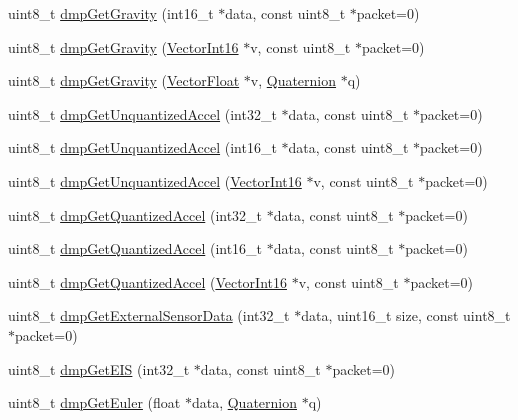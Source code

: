 \begin{DoxyCompactItemize}
\item 
uint8\+\_\+t \mbox{\hyperlink{classMPU6050_a557400f9ca5f07ff7d0d71f27f7a5169}{dmp\+Get\+Gravity}} (int16\+\_\+t $\ast$data, const uint8\+\_\+t $\ast$packet=0)
\item 
uint8\+\_\+t \mbox{\hyperlink{classMPU6050_adbeb3de073f6759bf8036a6f29697ea1}{dmp\+Get\+Gravity}} (\mbox{\hyperlink{classVectorInt16}{Vector\+Int16}} $\ast$v, const uint8\+\_\+t $\ast$packet=0)
\item 
uint8\+\_\+t \mbox{\hyperlink{classMPU6050_aa061914109ac5a74ad93c26c903abdd4}{dmp\+Get\+Gravity}} (\mbox{\hyperlink{classVectorFloat}{Vector\+Float}} $\ast$v, \mbox{\hyperlink{classQuaternion}{Quaternion}} $\ast$q)
\item 
uint8\+\_\+t \mbox{\hyperlink{classMPU6050_a1232c8fed01938c6137df40fa2436d31}{dmp\+Get\+Unquantized\+Accel}} (int32\+\_\+t $\ast$data, const uint8\+\_\+t $\ast$packet=0)
\item 
uint8\+\_\+t \mbox{\hyperlink{classMPU6050_a9e427b2ba43ee6e7ba057e7f638836d1}{dmp\+Get\+Unquantized\+Accel}} (int16\+\_\+t $\ast$data, const uint8\+\_\+t $\ast$packet=0)
\item 
uint8\+\_\+t \mbox{\hyperlink{classMPU6050_a814788fea7688802a9f1d91573e94630}{dmp\+Get\+Unquantized\+Accel}} (\mbox{\hyperlink{classVectorInt16}{Vector\+Int16}} $\ast$v, const uint8\+\_\+t $\ast$packet=0)
\item 
uint8\+\_\+t \mbox{\hyperlink{classMPU6050_a34f581edc9b3e12a645940e3f700642e}{dmp\+Get\+Quantized\+Accel}} (int32\+\_\+t $\ast$data, const uint8\+\_\+t $\ast$packet=0)
\item 
uint8\+\_\+t \mbox{\hyperlink{classMPU6050_aa180351de905ea4b06502adefc4411d3}{dmp\+Get\+Quantized\+Accel}} (int16\+\_\+t $\ast$data, const uint8\+\_\+t $\ast$packet=0)
\item 
uint8\+\_\+t \mbox{\hyperlink{classMPU6050_a584cb864d829606f98df54c8962ca934}{dmp\+Get\+Quantized\+Accel}} (\mbox{\hyperlink{classVectorInt16}{Vector\+Int16}} $\ast$v, const uint8\+\_\+t $\ast$packet=0)
\item 
uint8\+\_\+t \mbox{\hyperlink{classMPU6050_a72afcbd02dbc9d2cd02a9b29dfa1e8f2}{dmp\+Get\+External\+Sensor\+Data}} (int32\+\_\+t $\ast$data, uint16\+\_\+t size, const uint8\+\_\+t $\ast$packet=0)
\item 
uint8\+\_\+t \mbox{\hyperlink{classMPU6050_aa57210108896ae4ed01147fac40592e8}{dmp\+Get\+E\+IS}} (int32\+\_\+t $\ast$data, const uint8\+\_\+t $\ast$packet=0)
\item 
uint8\+\_\+t \mbox{\hyperlink{classMPU6050_ac2bac2a88ecdca4e0aa399c9d93e4cc3}{dmp\+Get\+Euler}} (float $\ast$data, \mbox{\hyperlink{classQuaternion}{Quaternion}} $\ast$q)

\end{DoxyCompactItemize}
